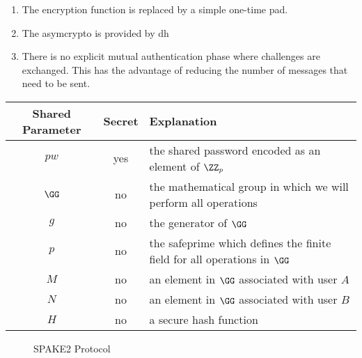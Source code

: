 \begin{enumerate}
  \item The encryption function is replaced by a simple one-time pad.
  \item The \gls{asymcrypto} is provided by \gls{dh}
  \item There is no explicit mutual authentication phase where challenges are exchanged.
    This has the advantage of reducing the number of messages that need to be sent.
\end{enumerate}

\begin{center}
  \begin{tabularx}{\linewidth}{ ccX }
    \toprule
    Shared Parameter & Secret & Explanation \\
    \midrule
    $pw$ & yes & the shared password encoded as an element of $\ZZ_p$ \\
    $\GG$ & no & the mathematical group in which we will perform all operations \\ 
    $g$ & no & the generator of $\GG$ \\
    $p$ & no & the \gls{safeprime} which defines the finite field for all operations in $\GG$ \\
    $M$ & no & an element in $\GG$ associated with user $A$ \\
    $N$ & no & an element in $\GG$ associated with user $B$ \\
    $H$ & no & a secure hash function \\
    \bottomrule
  \end{tabularx}
\end{center}

\begin{figure}[H]

  \caption{SPAKE2 Protocol}
  \label{fig:spake2}
\end{figure}

